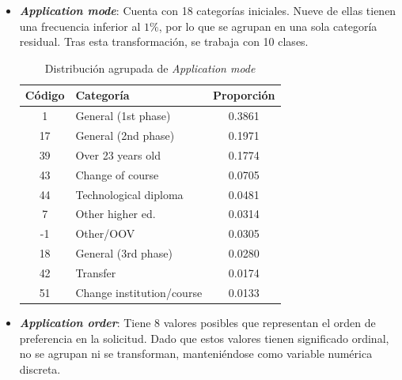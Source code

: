 \documentclass{report}[14pt]
\begin{document}
\begin{itemize}
    \item \textbf{\textit{Application mode}}: Cuenta con 18 categorías iniciales. Nueve de ellas tienen una frecuencia inferior al $1\%$, por lo que se agrupan en una sola categoría residual. Tras esta transformación, se trabaja con 10 clases.
    \begin{table}[H]
    \centering
    \begin{tabular}{|c|l|c|}
        \hline
        \textbf{Código} & \textbf{Categoría} & \textbf{Proporción} \\
        \hline
        1 & General (1st phase) & 0.3861 \\
        17 & General (2nd phase) & 0.1971 \\
        39 & Over 23 years old & 0.1774 \\
        43 & Change of course & 0.0705 \\
        44 & Technological diploma & 0.0481 \\
        7 & Other higher ed. & 0.0314 \\
        -1 & Other/OOV & 0.0305 \\
        18 & General (3rd phase) & 0.0280 \\
        42 & Transfer & 0.0174 \\
        51 & Change institution/course & 0.0133 \\
        \hline
    \end{tabular}
    \caption{Distribución agrupada de \textit{Application mode}}
    \label{tab:application_mode}
    \end{table}
    \item \textbf{\textit{Application order}}: Tiene 8 valores posibles que representan el orden de preferencia en la solicitud. Dado que estos valores tienen significado ordinal, no se agrupan ni se transforman, manteniéndose como variable numérica discreta.
    

\end{itemize}
\end{document}
